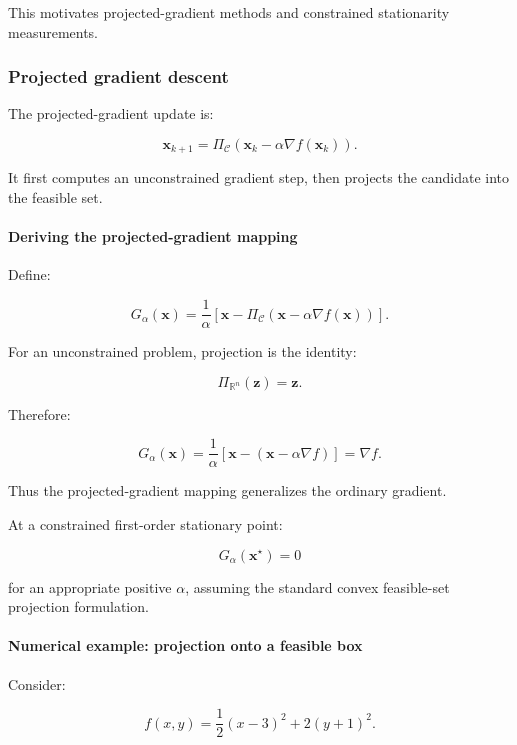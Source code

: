 This motivates projected-gradient methods and constrained stationarity measurements.

\subsubsection{Projected gradient descent}\label{02-foundations-ii-ch027-projected-gradient-descent}

The projected-gradient update is:

\[
\boxed{ \mathbf x_{k+1} = \Pi_{\mathcal C} \left( \mathbf x_k-\alpha\nabla f(\mathbf x_k) \right) }.
\]

It first computes an unconstrained gradient step, then projects the candidate into the feasible set.

\paragraph{Deriving the projected-gradient mapping}\label{02-foundations-ii-ch027-deriving-the-projected-gradient-mapping}

Define:

\[
\boxed{ G_\alpha(\mathbf x)= \frac1\alpha \left[ \mathbf x- \Pi_{\mathcal C} (\mathbf x-\alpha\nabla f(\mathbf x)) \right] }.
\]

For an unconstrained problem, projection is the identity:

\[
\Pi_{\mathbb R^n}(\mathbf z)=\mathbf z.
\]

Therefore:

\[
G_\alpha(\mathbf x) = \frac1\alpha[ \mathbf x-(\mathbf x-\alpha\nabla f) ] = \nabla f.
\]

Thus the projected-gradient mapping generalizes the ordinary gradient.

At a constrained first-order stationary point:

\[
\boxed{ G_\alpha(\mathbf x^\star)=0 }
\]

for an appropriate positive \(\alpha\), assuming the standard convex feasible-set projection formulation.

\paragraph{Numerical example: projection onto a feasible box}\label{02-foundations-ii-ch027-numerical-example-projection-onto-a-feasible-box}

Consider:

\[
f(x,y)= \frac12(x-3)^2+2(y+1)^2.
\]

